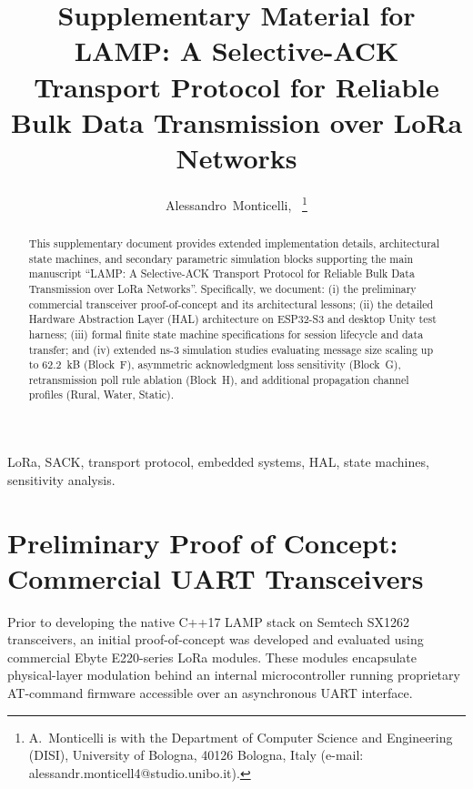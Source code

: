 \documentclass[journal]{IEEEtran}
\begin{document}
\title{Supplementary Material for LAMP: A Selective-ACK Transport Protocol for Reliable Bulk Data Transmission over LoRa Networks}

\author{Alessandro~Monticelli,~%
\thanks{A.~Monticelli is with the Department of Computer Science and Engineering (DISI), University of Bologna, 40126 Bologna, Italy (e-mail: alessandr.monticell4@studio.unibo.it).}}

\maketitle

\begin{abstract}
This supplementary document provides extended implementation details, architectural state machines, and secondary parametric simulation blocks supporting the main manuscript ``LAMP: A Selective-ACK Transport Protocol for Reliable Bulk Data Transmission over LoRa Networks''. Specifically, we document: (i) the preliminary commercial transceiver proof-of-concept and its architectural lessons; (ii) the detailed Hardware Abstraction Layer (HAL) architecture on ESP32-S3 and desktop Unity test harness; (iii) formal finite state machine specifications for session lifecycle and data transfer; and (iv) extended ns-3 simulation studies evaluating message size scaling up to 62.2~kB (Block~F), asymmetric acknowledgment loss sensitivity (Block~G), retransmission poll rule ablation (Block~H), and additional propagation channel profiles (Rural, Water, Static).
\end{abstract}

\begin{IEEEkeywords}
LoRa, SACK, transport protocol, embedded systems, HAL, state machines, sensitivity analysis.
\end{IEEEkeywords}
\acresetall

\section{Preliminary Proof of Concept: Commercial UART Transceivers}
\label{sec:supp_poc}
Prior to developing the native C++17 LAMP stack on Semtech SX1262 transceivers, an initial proof-of-concept was developed and evaluated using commercial Ebyte E220-series LoRa modules. These modules encapsulate physical-layer modulation behind an internal microcontroller running proprietary AT-command firmware accessible over an asynchronous UART interface.
\end{document}
